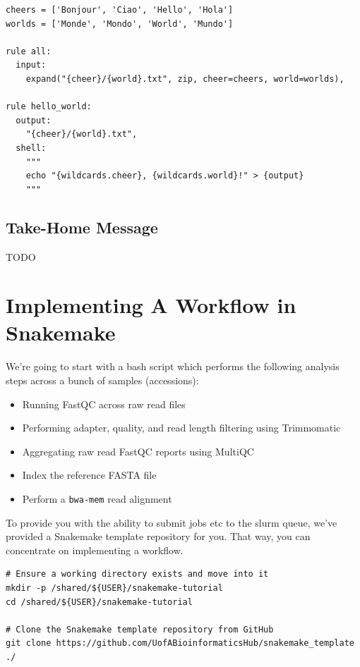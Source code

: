\begin{bonus}
\begin{lstlisting}
cheers = ['Bonjour', 'Ciao', 'Hello', 'Hola']
worlds = ['Monde', 'Mondo', 'World', 'Mundo']

rule all:
  input:
    expand("{cheer}/{world}.txt", zip, cheer=cheers, world=worlds),

rule hello_world:
  output:
    "{cheer}/{world}.txt",
  shell:
    """
    echo "{wildcards.cheer}, {wildcards.world}!" > {output}
    """
\end{lstlisting}

\end{bonus}

\subsection{Take-Home Message}

TODO

\section{Implementing A Workflow in Snakemake}

We're going to start with a bash script which performs the following analysis steps across a bunch of samples (accessions):

\begin{itemize}
  \item Running FastQC across raw read files
  \item Performing adapter, quality, and read length filtering using Trimmomatic
  \item Aggregating raw read FastQC reports using MultiQC
  \item Index the reference FASTA file
  \item Perform a \texttt{bwa-mem} read alignment
\end{itemize}

To provide you with the ability to submit jobs etc to the slurm queue, we've provided a Snakemake template repository for you. That way,
you can concentrate on implementing a workflow. 

\begin{lstlisting}
# Ensure a working directory exists and move into it
mkdir -p /shared/${USER}/snakemake-tutorial
cd /shared/${USER}/snakemake-tutorial

# Clone the Snakemake template repository from GitHub
git clone https://github.com/UofABioinformaticsHub/snakemake_template ./
\end{lstlisting}

